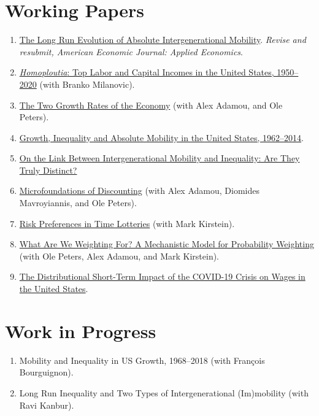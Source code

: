 \documentclass[10pt]{article}
\begin{document}
\section*{Working Papers}
\begin{enumerate}%
\item \href{https://bit.ly/AbsoluteMobility}{The Long Run Evolution of Absolute Intergenerational Mobility}. \textit{Revise and resubmit, American Economic Journal: Applied Economics}.
\item \href{https://bit.ly/HomoploutiaWIL}{\textit{Homoploutia}: Top Labor and Capital Incomes in the United States, 1950--2020} (with Branko Milanovic).
\item \href{https://bit.ly/DDP_WP}{The Two Growth Rates of the Economy} (with Alex Adamou, and Ole Peters).
\item \href{https://bit.ly/2OgeI8A}{Growth, Inequality and Absolute Mobility in the United States, 1962--2014}.
\item \href{https://bit.ly/2JcKCOc}{On the Link Between Intergenerational Mobility and Inequality: Are They Truly Distinct?}
\item \href{https://bit.ly/2AHQ2vZ}{Microfoundations of Discounting} (with Alex Adamou, Diomides Mavroyiannis, and Ole Peters).
\item \href{https://bit.ly/TimeLotteries}{Risk Preferences in Time Lotteries} (with Mark Kirstein).
\item \href{https://arxiv.org/abs/2005.00056}{What Are We Weighting For? A Mechanistic Model for Probability Weighting} (with Ole Peters, Alex Adamou, and Mark Kirstein).
\item \href{https://bit.ly/COVID_WAGES_Berman}{The Distributional Short-Term Impact of the COVID-19 Crisis on Wages in the United States}.
\end{enumerate}

\section*{Work in Progress}
\begin{enumerate}
\item Mobility and Inequality in US Growth, 1968--2018 (with Fran\c{c}ois Bourguignon).
\item Long Run Inequality and Two Types of Intergenerational (Im)mobility (with Ravi Kanbur).
\end{enumerate}
\end{document}
